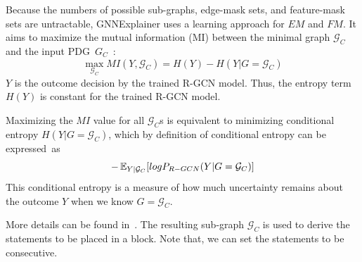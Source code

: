 
Because the numbers of possible sub-graphs, edge-mask sets, and
feature-mask sets are untractable, GNNExplainer uses a learning
approach for $EM$ and $FM$. It aims to maximize the mutual information
(MI) between the minimal graph $\mathcal{G}_C$ and the input
PDG~$G_C$~\cite{GNNExplainer}:
\begin{equation}\label{maineq}
\max_{\mathcal{G}_C} MI(Y,\mathcal{G}_C) = H(Y) - H(Y|G=\mathcal{G}_C)
\end{equation}
$Y$ is the outcome decision by the trained R-GCN model. Thus, the
entropy term $H(Y)$ is constant for the trained R-GCN
model.

Maximizing the $MI$ value for all $\mathcal{G}_C$s is equivalent
to minimizing conditional entropy $H(Y|G=\mathcal{G}_C)$, which by
definition of conditional entropy can be expressed~as
\begin{equation}
  \label{eq2}
-\operatorname{\mathbb{E}}_{Y|\mathcal{G}_C}
  [log P_{R-GCN} (Y|G=\mathcal{G}_C)]
\end{equation}
This conditional entropy is a measure of how
much uncertainty remains about the outcome $Y$ when we know
$G=\mathcal{G}_C$.
%
%

More details can be found in~\cite{GNNExplainer}. The resulting
sub-graph $\mathcal{G}_C$ is used to derive the statements to be
placed in a  block. Note that, we can set the
statements to be consecutive.
